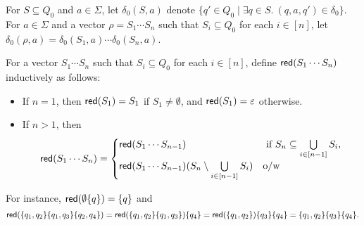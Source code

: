 For $S \subseteq Q_0$ and $a \in \Sigma$, let $\delta_0(S,a)$ denote $\{q' \in Q_0 \mid \exists q \in S.\ (q,a,q') \in \delta_0 \}$. For $a \in \Sigma$ and a vector $\rho = S_1 \cdots S_n$ such that $S_i \subseteq Q_0$ for each $i \in [n]$, let $\delta_0(\rho,a)=\delta_0(S_1,a) \cdots \delta_0(S_n, a)$.

For a vector $S_1 \cdots S_n$ such that $S_i \subseteq Q_0$ for each $i \in [n]$, define $\mathsf{red}(S_1 \cdots S_n)$ inductively as follows:  
\begin{itemize}
\item If $n = 1$, then $\mathsf{red}(S_1)=S_1$ if $S_1 \neq \emptyset$, and $\mathsf{red}(S_1)=\varepsilon$ otherwise.
% 
\item If $n > 1$, then 
\[
\mathsf{red}(S_1 \cdots S_n)=
\begin{cases}
\mathsf{red}(S_1 \cdots S_{n-1}) & \mbox{ if } S_n \subseteq \bigcup \limits_{i \in [n-1]} S_i,\\
\mathsf{red}(S_1 \cdots S_{n-1}) (S_n \setminus \bigcup \limits_{i \in [n-1]} S_i) &  \mbox{o/w}
\end{cases}
\]
%
\end{itemize}
For instance, 
%
$\mathsf{red}(\emptyset\{q\})=\{q\}$ and 
$$\mathsf{red}(\{q_1, q_2\} \{q_1, q_3\} \{q_2, q_4\})=\mathsf{red}(\{q_1,q_2\}\{q_1,q_3\})\{q_4\}= \mathsf{red}(\{q_1,q_2\}) \{q_3\} \{q_4\} = \{q_1,q_2\} \{q_3\}\{q_4\}.$$

